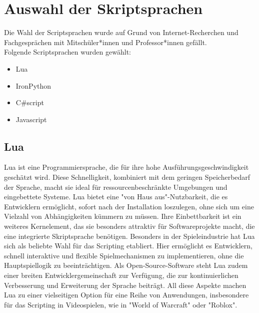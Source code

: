\section{Auswahl der Skriptsprachen}

Die Wahl der Scriptsprachen wurde auf Grund von Internet-Recherchen 
und Fachgesprächen mit Mitschüler*innen und Professor*innen gefällt.\\
Folgende Scriptsprachen wurden gewählt:

\begin{itemize}
    \item Lua
    \item IronPython
    \item C\#script
    \item Javascript
\end{itemize}

\subsection{Lua}
Lua ist eine Programmiersprache, die für ihre hohe Ausführungsgeschwindigkeit geschätzt wird. 
Diese Schnelligkeit, kombiniert mit dem geringen Speicherbedarf der Sprache, macht sie ideal für ressourcenbeschränkte Umgebungen und eingebettete Systeme. 
Lua bietet eine "von Haus aus"-Nutzbarkeit, die es Entwicklern ermöglicht, sofort nach der Installation loszulegen, ohne sich um eine Vielzahl von Abhängigkeiten kümmern zu müssen. 
Ihre Einbettbarkeit ist ein weiteres Kernelement, das sie besonders attraktiv für Softwareprojekte macht, die eine integrierte Skriptsprache benötigen. Besonders in der Spieleindustrie hat Lua sich als beliebte Wahl für das Scripting etabliert. Hier ermöglicht es Entwicklern, schnell interaktive und flexible Spielmechanismen zu implementieren, ohne die Hauptspiellogik zu beeinträchtigen. 
Als Open-Source-Software steht Lua zudem einer breiten Entwicklergemeinschaft zur Verfügung, die zur kontinuierlichen Verbesserung und Erweiterung der Sprache beiträgt.
All diese Aspekte machen Lua zu einer vielseitigen Option für eine Reihe von Anwendungen, insbesondere für das Scripting in Videospielen, wie in "World of Warcraft" oder "Roblox".
\cite{gameScriptingMastery} \cite{luaDocs} \cite{programingInLua} \cite{nluaWebside} 

\newpage
